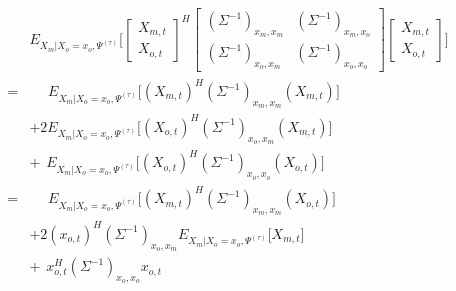 \documentclass[11pt]{article}
\begin{document}
\begin{align*}
& E_{X_m|X_o=x_o, \Psi^{(\tau)}} \Big[ \begin{bmatrix} X_{m, t} \\  X_{o, t} \end{bmatrix}^H \begin{bmatrix} (\Sigma^{-1})_{x_m, x_m} & (\Sigma^{-1})_{x_m, x_o} \\ (\Sigma^{-1})_{x_o, x_m} & (\Sigma^{-1})_{x_o, x_o} \end{bmatrix} \begin{bmatrix} X_{m, t} \\  X_{o, t} \end{bmatrix} \Big] \\
=&\hspace{16pt} E_{X_m|X_o=x_o, \Psi^{(\tau)}} \Big[ ( X_{m,t})^H (\Sigma^{-1})_{x_m, x_m} ( X_{m, t}) \Big] \\ 
&+ 2 E_{X_m|X_o=x_o, \Psi^{(\tau)}} \Big[ ( X_{o, t})^H (\Sigma^{-1})_{x_o, x_m} ( X_{m, t}) \Big] \\ 
&+ \hspace{5pt} E_{X_m|X_o=x_o, \Psi^{(\tau)}} \Big[ ( X_{o, t})^H (\Sigma^{-1})_{x_o, x_o} (  X_{o, t}) \Big] \\
=&\hspace{16pt} E_{X_m|X_o=x_o, \Psi^{(\tau)}} \Big[ ( X_{m, t})^H (\Sigma^{-1})_{x_m, x_m} ( X_{o, t}) \Big] \\ 
&+ 2 ( x_{o, t})^H (\Sigma^{-1})_{x_o, x_m} E_{X_m|X_o=x_o, \Psi^{(\tau)}} \Big[  X_{m, t} \Big] \\ 
&+ \hspace{5pt} x_{o, t}^H (\Sigma^{-1})_{x_o, x_o} x_{o, t}
\end{align*}
\end{document}
